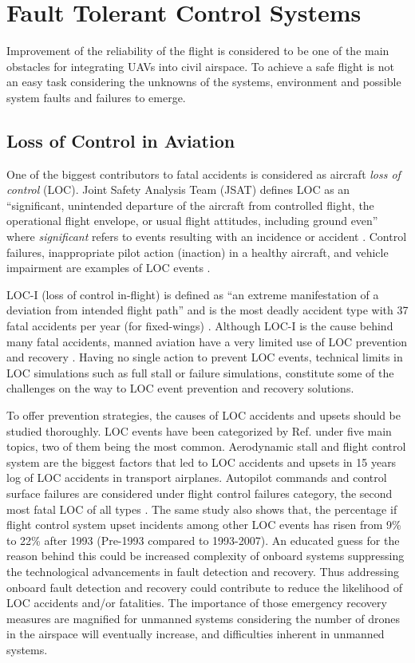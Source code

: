 	
\section{Fault Tolerant Control Systems}

Improvement of the reliability of the flight is considered to be one of the main obstacles for integrating UAVs into civil airspace. 
To achieve a safe flight is not an easy task considering the unknowns of the systems, environment and possible system faults and failures to emerge. 

\subsection{Loss of Control in Aviation}

One of the biggest contributors to fatal accidents is considered as aircraft \emph{loss of control} (LOC). 
Joint Safety Analysis Team (JSAT) defines LOC as an ``significant, unintended departure of the aircraft from controlled flight, the operational flight envelope, or usual flight attitudes, including ground even'' where \emph{significant} refers to events resulting with an incidence or accident \cite{russell2000joint}. 
Control failures, inappropriate pilot action (inaction) in a healthy aircraft, and vehicle impairment are examples of LOC events \cite{richards2016vehicle}.

LOC-I (loss of control in-flight) is defined as ``an extreme manifestation of a deviation from intended flight path'' and is the most deadly accident type with 37 fatal accidents per year (for fixed-wings) \cite{easa:LOC}.
Although LOC-I is the cause behind many fatal accidents, manned aviation have a very limited use of LOC prevention and recovery \cite{belcastro2017aircraft}. 
Having no single action to prevent LOC events, technical limits in LOC simulations such as full stall or failure simulations, constitute some of the challenges on the way to LOC event prevention and recovery solutions.

To offer prevention strategies, the causes of LOC accidents and upsets should be studied thoroughly. 
LOC events have been categorized by Ref.\cite{lambregts2008airplane} under five main topics, two of them being the most common. 
Aerodynamic stall and flight control system are the biggest factors that led to LOC accidents and upsets in 15 years log of LOC accidents in transport airplanes.
Autopilot commands and control surface failures are considered under flight control failures category, the second most fatal LOC of all types \cite{lambregts2008airplane}. 
The same study also shows that, the percentage if flight control system upset incidents among other LOC events has risen from 9\% to 22\% after 1993 (Pre-1993 compared to 1993-2007).
An educated guess for the reason behind this could be increased complexity of onboard systems suppressing the technological advancements in fault detection and recovery. 
Thus addressing onboard fault detection and recovery could contribute to reduce the likelihood of LOC accidents and/or fatalities. 
The importance of those emergency recovery measures are magnified for unmanned systems considering the number of drones in the airspace will eventually increase, and difficulties inherent in unmanned systems. 

